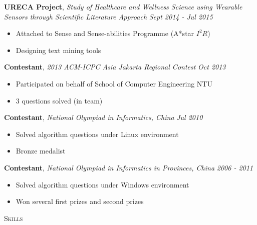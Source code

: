 \documentclass[a4paper, 10pt]{article}
\newenvironment{changemargin}[2]{%
  \begin{list}{}{%
      \setlength{\topsep}{0pt}%
      \setlength{\leftmargin}{#1}%
      \setlength{\rightmargin}{#2}%
      \setlength{\listparindent}{\parindent}%
      \setlength{\itemindent}{\parindent}%
      \setlength{\parsep}{\parskip}%
    }%
  \item[]}{\end{list}
}
\newcommand{\lineover}{
  \begin{changemargin}{-0.05in}{-0.05in}
    \vspace*{-8pt}
    \hrulefill \\
    \vspace*{-2pt}
  \end{changemargin}
}
\newcommand{\header}[1]{
  \begin{changemargin}{-0.5in}{-0.5in}
    \scshape{#1}\\
    \lineover
  \end{changemargin}
}
\newenvironment{body}
{
\vspace*{-16pt}
\begin{changemargin}{-0.25in}{-0.5in}
}	
{
\end{changemargin}
}
\begin{document}
\begin{body}
  \vspace{14pt}

  \textbf{URECA Project}, \emph{Study of Healthcare and Wellness Science using Wearable Sensors through Scientific Literature Approach} \hfill \emph{Sept 2014 - Jul 2015}\\
  \vspace*{-4pt}
  \begin{itemize} \itemsep -0pt  %
  \item Attached to Sense and Sense-abilities Programme (A*star $I^{2}R$)
  \item Designing text mining tools
  \end{itemize}

  \textbf{Contestant}, \emph{2013 ACM-ICPC Asia Jakarta Regional Contest} \hfill \emph{Oct 2013}\\
  \vspace*{-4pt}
  \begin{itemize} \itemsep -0pt  %
  \item Participated on behalf of School of Computer Engineering NTU
  \item 3 questions solved (in team)
  \end{itemize}
  
  \textbf {Contestant}, \emph{National Olympiad in Informatics, China} \hfill \emph{Jul 2010}\\
  \vspace*{-4pt}
  \begin{itemize} \itemsep -0pt
  \item Solved algorithm questions under Linux environment
  \item Bronze medalist
  \end{itemize}

  \textbf {Contestant}, \emph{National Olympiad in Informatics in Provinces, China} \hfill \emph{2006 - 2011}\\
  \vspace*{-4pt}
  \begin{itemize} \itemsep -0pt
  \item Solved algorithm questions under Windows environment
  \item Won several first prizes and second prizes
  \end{itemize}
\end{body}

\smallskip
\medskip
%
%
%
%
\header{Skills}
\end{document}
